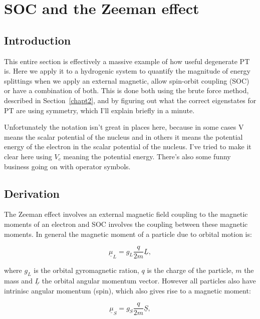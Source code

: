 \chapter{SOC and the Zeeman effect}
\label{chapt4}

\section{Introduction}

This entire section is effectively a massive example of how useful degenerate PT is. Here we apply it to a hydrogenic system to quantify the magnitude of energy splittings when we apply an external magnetic, allow spin-orbit coupling (SOC) or have a combination of both. This is done both using the brute force method, described in Section~\ref{chapt2}, and by figuring out what the correct eigenstates for PT are using symmetry, which I'll explain briefly in a minute.

\noindent Unfortunately the notation isn't great in places here, because in some cases V means the scalar potential of the nucleus and in others it means the potential energy of the electron in the scalar potential of the nucleus. I've tried to make it clear here using $V_c$ meaning the potential energy. There's also some funny business going on with operator symbols.

\section{Derivation}

The Zeeman effect involves an external magnetic field coupling to the magnetic moments of an electron and SOC involves the coupling between these magnetic moments. In general the magnetic moment of a particle due to orbital motion is:

\begin{equation}
    \underline{\mu}_L = g_L \frac{q}{2m} \underline{L},
    \label{OrbitalMagneticMoment}
\end{equation}

\noindent where $g_L$ is the orbital gyromagnetic ration, $q$ is the charge of the particle, $m$ the mass and $\underline{L}$ the orbital angular momentum vector. However all particles also have intrinisc angular momentum (spin), which also gives rise to a magnetic moment:

\begin{equation}
    \underline{\mu}_S = g_S \frac{q}{2m} \underline{S},
    \label{SpinMagneticMoment}
\end{equation}

